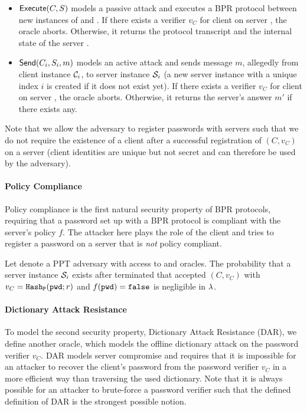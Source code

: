 \begin{itemize}
  \item $\mathsf{Execute}(C,S)$ models a passive attack and executes a \ac{BPR} protocol between new instances of \Client and \Server.
        If there exists a verifier $v_C$ for client \Client on server \Server, the oracle aborts.
        Otherwise, it returns the protocol transcript and the internal state of the server \Server.
  \item $\mathsf{Send}(C_i,S_i,m)$ models an active attack and sends message $m$, allegedly from client instance $\mathcal{C}_i$, to server instance $\mathcal{S}_i$ (a new server instance with a unique index $i$ is created if it does not exist yet).
        If there exists a verifier $v_C$ for client \Client on server \Server, the oracle aborts.
        Otherwise, it returns the server's answer $m'$ if there exists any.
\end{itemize}

\noindent
Note that we allow the adversary to register passwords with servers such that we do not require the existence of a client \Client after a successful registration of $(C,v_C)$ on a server (client identities \Client are unique but not secret and can therefore be used by the adversary).

\paragraph{Policy Compliance}
Policy compliance is the first natural security property of \ac{BPR} protocols, requiring that a password set up with a \ac{BPR} protocol is compliant with the server's policy $f$.
The attacker here plays the role of the client and tries to register a password \pwd on a server that is \emph{not} policy compliant.

\begin{definition}\label{def:pc}
Let \cA denote a PPT adversary with access to \Execute and \Send oracles.
The probability that a server instance $\mathcal{S}_i$ exists after \cA terminated that accepted $(C,v_C)$ with $v_C=\mathtt{Hash_P}(\mathtt{pwd};r)$ and $f(\mathtt{pwd})=\mathtt{false}$ is negligible in $\lambda$.
\eod
\end{definition}

\paragraph{Dictionary Attack Resistance}
To model the second security property, Dictionary Attack Resistance (DAR), we define another oracle, which models the offline dictionary attack on the password verifier $v_C$.
DAR models server compromise and requires that it is impossible for an attacker to recover the client's password from the password verifier $v_C$ in a more efficient way than traversing the used dictionary.
Note that it is always possible for an attacker to brute-force a password verifier such that the defined definition of DAR is the strongest possible notion.

